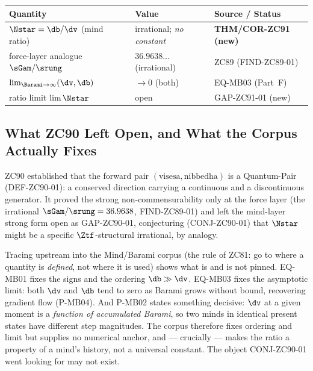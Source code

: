 \documentclass[12pt, a4paper]{article}
\begin{document}
\begin{keybox}[title={Numerical Summary --- ZC91 (T-canonical)}]
{\footnotesize\renewcommand{\arraystretch}{1.3}
\begin{center}
\begin{tabular}{@{}p{5.4cm}p{3.2cm}p{3.6cm}@{}}
\toprule
\textbf{Quantity} & \textbf{Value} & \textbf{Source / Status} \\
\midrule
$\Nstar=\db/\dv$ (mind ratio)
  & irrational; \emph{no constant}
  & \textbf{THM/COR-ZC91 (new)} \\
force-layer analogue $\sGam/\srung$
  & $36.9638\ldots$ (irrational)
  & ZC89 (FIND-ZC89-01) \\
$\lim_{\Barami\to\infty}(\dv,\db)$
  & $\to 0$ (both)
  & EQ-MB03 (Part~F) \\
ratio limit $\lim\Nstar$
  & open
  & GAP-ZC91-01 (new) \\
\bottomrule
\end{tabular}
\end{center}}
\end{keybox}

\subsection{What ZC90 Left Open, and What the Corpus Actually Fixes}

ZC90 established that the forward pair $(\text{visesa},\text{nibbedha})$
is a Quantum-Pair (DEF-ZC90-01): a conserved direction carrying a
continuous and a discontinuous generator. It proved the strong
non-commensurability only at the force layer (the irrational
$\sGam/\srung=36.9638$, FIND-ZC89-01) and left the mind-layer strong form
open as GAP-ZC90-01, conjecturing (CONJ-ZC90-01) that $\Nstar$ might be a
specific $\Ztf$-structural irrational, by analogy.

Tracing upstream into the Mind/Barami corpus (the rule of ZC81: go to
where a quantity is \emph{defined}, not where it is used) shows what is
and is not pinned. EQ-MB01 fixes the signs and the ordering $\db\gg\dv$.
EQ-MB03 fixes the asymptotic limit: both $\dv$ and $\db$ tend to zero as
Barami grows without bound, recovering gradient flow (P-MB04). And P-MB02
states something decisive: $\dv$ at a given moment is a \emph{function of
accumulated Barami}, so two minds in identical present states have
different step magnitudes. The corpus therefore fixes ordering and limit
but supplies no numerical anchor, and --- crucially --- makes the ratio a
property of a mind's history, not a universal constant. The object
CONJ-ZC90-01 went looking for may not exist.
\end{document}
